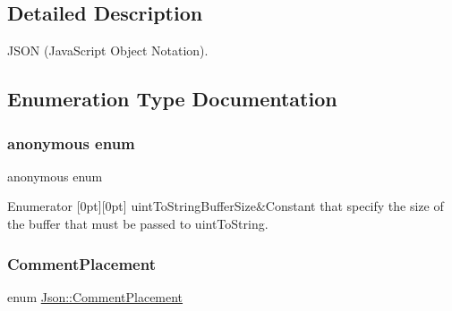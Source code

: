 \subsection{Detailed Description}
J\+S\+ON (Java\+Script Object Notation). 

\subsection{Enumeration Type Documentation}
\mbox{\label{namespace_json_a0c5f614b019f20b4598dcaec09d9e820}} 
\subsubsection{\texorpdfstring{anonymous enum}{anonymous enum}}
{\footnotesize\ttfamily anonymous enum}

\begin{DoxyEnumFields}{Enumerator}
[0pt][0pt]{}\mbox{\label{namespace_json_a0c5f614b019f20b4598dcaec09d9e820ae4f2008c7919f20d81286121d1374424}} 
uint\+To\+String\+Buffer\+Size&Constant that specify the size of the buffer that must be passed to uint\+To\+String. \\
\hline

\end{DoxyEnumFields}
\mbox{\label{namespace_json_a4fc417c23905b2ae9e2c47d197a45351}} 
\subsubsection{\texorpdfstring{Comment\+Placement}{CommentPlacement}}
{\footnotesize\ttfamily enum \hyperlink{namespace_json_a4fc417c23905b2ae9e2c47d197a45351}{Json\+::\+Comment\+Placement}}

